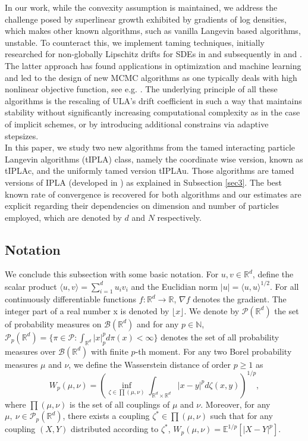 \documentclass[a4paper, 10pt]{article}
\theoremstyle{plain}%
\begin{document}
\indent In our work, while the convexity assumption is maintained, we address the challenge posed by superlinear growth exhibited by gradients of log densities, which makes other known algorithms, such as vanilla Langevin based algorithms, unstable. To counteract this, we implement taming techniques, initially researched for non-globally Lipschitz drifts for SDEs in \cite{Hutzenthaler2} and subsequently in \cite{sabanis_2013} and \cite{Sabanis_2016}. The latter approach has found applications in optimization and machine learning and led to the design of new MCMC algorithms as one typically deals with high nonlinear objective function, see e.g. \cite{TULA,lim2023nonasymptotic,lovas2023taming,sabanis2019higher}. The underlying principle of all these algorithms is the rescaling of ULA's drift coefficient in such a way that maintains stability without significantly increasing computational complexity as in the case of implicit schemes, or by introducing additional constrains via adaptive stepsizes.\\
\indent In this paper, we study two new algorithms from the tamed interacting particle Langevin algorithms (tIPLA) class, namely the coordinate wise version, known as tIPLAc, and the uniformly tamed version tIPLAu. Those algorithms are tamed versions of IPLA (developed in \cite{Ipla}) as explained in Subsection \ref{sec3}. The best known rate of convergence is recovered for both algorithms and our estimates are explicit regarding their dependencies on dimension and number of particles employed, which are denoted by $d$ and $N$ respectively.
\subsection{Notation}
We conclude this subsection with some basic notation. For $u,v\in\mathbb{R}^d$, define the scalar product $\langle u,v\rangle=\sum_{i=1}^d u_i v_i$ and the Euclidian norm $|u|={\langle u,u\rangle}^{1/2}$. For all continuously differentiable functions $f:\mathbb{R}^d\to\mathbb{R}$, $\nabla f$ denotes the gradient. The integer part of a real number x is denoted by $\lfloor x \rfloor$. We denote by $\mathcal{P}(\mathbb{R}^d)$ the set of probability measures on $\mathcal{B}(\mathbb{R}^d)$ and for any $p\in\mathbb{N}$, $\mathcal{P}_p(\mathbb{R}^d)=\{\pi\in\mathcal{P}:\int_{\mathbb{R}^d}|x|^p_pd\pi(x)<\infty\}$ denotes the set of all probability measures over $\mathcal{B}(\mathbb{R}^d)$ with finite $p$-th moment. For any two Borel probability measures $\mu$ and $\nu$, we define the Wasserstein distance of order $p\geq 1$ as
$$W_p(\mu,\nu)=\left(\inf_{\zeta\in\prod(\mu,\nu)}\int_{\mathbb{R}^d\times\mathbb{R}^d}|x-y|^p d\zeta(x,y)\right)^{1/p},$$
where $\prod(\mu,\nu)$ is the set of all couplings of $\mu$ and $\nu$. Moreover, for any $\mu,\ \nu\in\mathcal{P}_p(\mathbb{R}^d) $, there exists a coupling $\zeta^*\in\prod(\mu,\nu)$ such that for any coupling $(X,Y)$ distributed according to $\zeta^*$, $W_p(\mu,\nu)=\mathbb{E}^{1/p}\left[\left|X-Y\right|^p\right]$.
\end{document}
